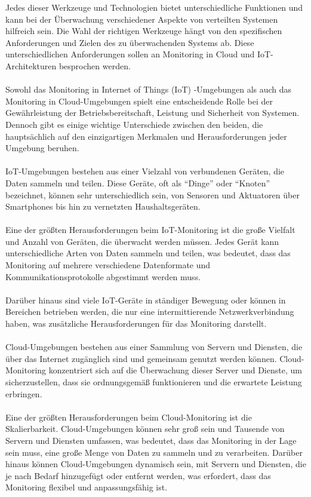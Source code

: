 Jedes dieser Werkzeuge und Technologien bietet unterschiedliche Funktionen und kann bei der Überwachung verschiedener Aspekte von verteilten Systemen hilfreich sein. Die Wahl der richtigen Werkzeuge hängt von den spezifischen Anforderungen und Zielen des zu überwachenden Systems ab. Diese unterschiedlichen Anforderungen sollen an Monitoring in Cloud und IoT-Architekturen besprochen werden. 
\\\\
Sowohl das Monitoring in Internet of Things (IoT) -Umgebungen als auch das Monitoring in Cloud-Umgebungen spielt eine entscheidende Rolle bei der Gewährleistung der Betriebsbereitschaft, Leistung und Sicherheit von Systemen. Dennoch gibt es einige wichtige Unterschiede zwischen den beiden, die hauptsächlich auf den einzigartigen Merkmalen und Herausforderungen jeder Umgebung beruhen.
\\\\
IoT-Umgebungen bestehen aus einer Vielzahl von verbundenen Geräten, die Daten sammeln und teilen. Diese Geräte, oft als \enquote{Dinge} oder \enquote{Knoten} bezeichnet, können sehr unterschiedlich sein, von Sensoren und Aktuatoren über Smartphones bis hin zu vernetzten Haushaltsgeräten.
\\\\
Eine der größten Herausforderungen beim IoT-Monitoring ist die große Vielfalt und Anzahl von Geräten, die überwacht werden müssen. Jedes Gerät kann unterschiedliche Arten von Daten sammeln und teilen, was bedeutet, dass das Monitoring auf mehrere verschiedene Datenformate und Kommunikationsprotokolle abgestimmt werden muss.
\\\\
Darüber hinaus sind viele IoT-Geräte in ständiger Bewegung oder können in Bereichen betrieben werden, die nur eine intermittierende Netzwerkverbindung haben, was zusätzliche Herausforderungen für das Monitoring darstellt.
\\\\
Cloud-Umgebungen bestehen aus einer Sammlung von Servern und Diensten, die über das Internet zugänglich sind und gemeinsam genutzt werden können. Cloud-Monitoring konzentriert sich auf die Überwachung dieser Server und Dienste, um sicherzustellen, dass sie ordnungsgemäß funktionieren und die erwartete Leistung erbringen.
\\\\
Eine der größten Herausforderungen beim Cloud-Monitoring ist die Skalierbarkeit. Cloud-Umgebungen können sehr groß sein und Tausende von Servern und Diensten umfassen, was bedeutet, dass das Monitoring in der Lage sein muss, eine große Menge von Daten zu sammeln und zu verarbeiten. Darüber hinaus können Cloud-Umgebungen dynamisch sein, mit Servern und Diensten, die je nach Bedarf hinzugefügt oder entfernt werden, was erfordert, dass das Monitoring flexibel und anpassungsfähig ist.
